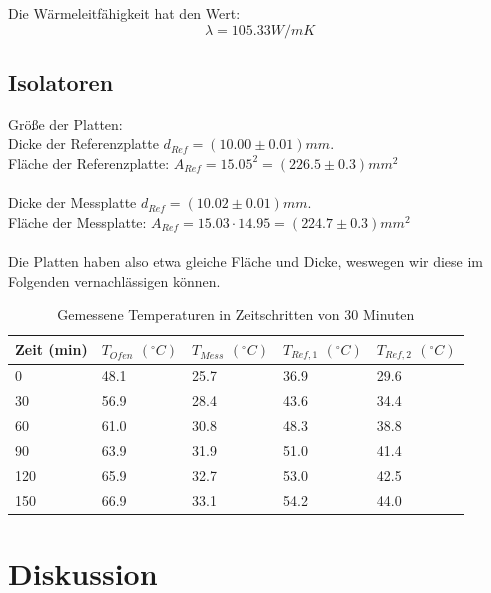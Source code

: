 \documentclass[12pt,a4paper,twopage]{article}
\begin{document}
Die Wärmeleitfähigkeit hat den Wert:
$$\boxed{\lambda=105.33 W/m K}$$

\subsection{Isolatoren}
Größe der Platten:\\
Dicke der Referenzplatte $d_{Ref}=(10.00 \pm 0.01)mm$.\\
Fläche der Referenzplatte: $A_{Ref}=15.05^2=(226.5 \pm 0.3)mm^2$\\
\\
Dicke der Messplatte $d_{Ref}=(10.02 \pm 0.01)mm$.\\
Fläche der Messplatte: $A_{Ref}=15.03 \cdot 14.95=(224.7 \pm 0.3)mm^2$\\
\\
Die Platten haben also etwa gleiche Fläche und Dicke, weswegen wir diese im Folgenden vernachlässigen können.\\

\begin{table}
\begin{center}
\begin{tabular}{|l|l|l|l|l|}
\hline
Zeit (min) & $T_{Ofen}$ $(^\circ C)$ & $T_{Mess}$ $(^\circ C)
$& $T_{Ref,1}$ $(^\circ C)$ & $T_{Ref,2}$ $(^\circ C)$\\
\hline
0 & 48.1 & 25.7 & 36.9 & 29.6\\
30 & 56.9 & 28.4 & 43.6 & 34.4\\
60 & 61.0 & 30.8 & 48.3 & 38.8\\
90 & 63.9 & 31.9 & 51.0 & 41.4\\
120 & 65.9 & 32.7 & 53.0 & 42.5\\
150 & 66.9 & 33.1 & 54.2 & 44.0\\
\hline
\end{tabular}
\caption{Gemessene Temperaturen in Zeitschritten von 30 Minuten}
\end{center}
\end{table}

\section{Diskussion}
																								
\end{document}
